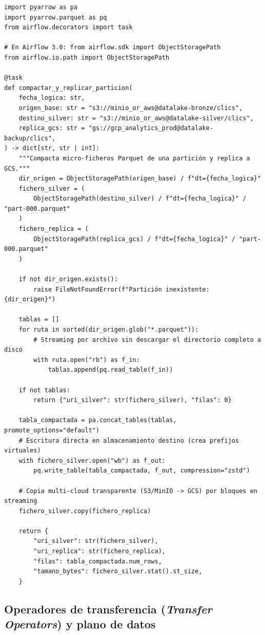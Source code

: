 \begin{lstlisting}[style=python, caption={Lectura, escritura particionada y copia multi-cloud (S3/MinIO -> GCS) mediante \texttt{ObjectStoragePath}.}, label={lst:object-storage-path}]
import pyarrow as pa
import pyarrow.parquet as pq
from airflow.decorators import task

# En Airflow 3.0: from airflow.sdk import ObjectStoragePath
from airflow.io.path import ObjectStoragePath

@task
def compactar_y_replicar_particion(
    fecha_logica: str,
    origen_base: str = "s3://minio_or_aws@datalake-bronze/clics",
    destino_silver: str = "s3://minio_or_aws@datalake-silver/clics",
    replica_gcs: str = "gs://gcp_analytics_prod@datalake-backup/clics",
) -> dict[str, str | int]:
    """Compacta micro-ficheros Parquet de una partición y replica a GCS."""
    dir_origen = ObjectStoragePath(origen_base) / f"dt={fecha_logica}"
    fichero_silver = (
        ObjectStoragePath(destino_silver) / f"dt={fecha_logica}" / "part-000.parquet"
    )
    fichero_replica = (
        ObjectStoragePath(replica_gcs) / f"dt={fecha_logica}" / "part-000.parquet"
    )

    if not dir_origen.exists():
        raise FileNotFoundError(f"Partición inexistente: {dir_origen}")

    tablas = []
    for ruta in sorted(dir_origen.glob("*.parquet")):
        # Streaming por archivo sin descargar el directorio completo a disco
        with ruta.open("rb") as f_in:
            tablas.append(pq.read_table(f_in))

    if not tablas:
        return {"uri_silver": str(fichero_silver), "filas": 0}

    tabla_compactada = pa.concat_tables(tablas, promote_options="default")
    # Escritura directa en almacenamiento destino (crea prefijos virtuales)
    with fichero_silver.open("wb") as f_out:
        pq.write_table(tabla_compactada, f_out, compression="zstd")

    # Copia multi-cloud transparente (S3/MinIO -> GCS) por bloques en streaming
    fichero_silver.copy(fichero_replica)

    return {
        "uri_silver": str(fichero_silver),
        "uri_replica": str(fichero_replica),
        "filas": tabla_compactada.num_rows,
        "tamano_bytes": fichero_silver.stat().st_size,
    }
\end{lstlisting}

\subsection{Operadores de transferencia (\textit{Transfer Operators}) y plano de datos}


